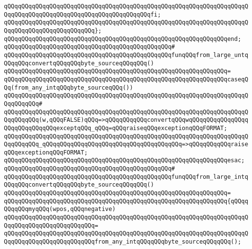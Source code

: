 \verb|qQQqqQQqqQQqqQQqqQQqqQQqqQQqqQQqqQQqqQQqqQQqqQQqqQQqqQQqqQQqqQQqqQQqqQQqqQQqqQQqqQQqqQQqqQQqqQQqqQQqqQQqqQQqqQQqfi;|\newline
\verb|qQQqqQQqqQQqqQQqqQQqqQQqqQQqqQQqqQQqqQQqqQQqqQQqqQQqqQQqqQQqqQQqqQQqqQQqqQQqqQQqqQQqqQQqqQQqqQQq};|\newline
\verb|qQQqqQQqqQQqqQQqqQQqqQQqqQQqqQQqqQQqqQQqqQQqqQQqqQQqqQQqqQQqqQQqend;|\newline
\newline
\verb|qQQqqQQqqQQqqQQqqQQqqQQqqQQqqQQqqQQqqQQqqQQqqQQq#|\newline
\verb|qQQqqQQqqQQqqQQqqQQqqQQqqQQqqQQqqQQqqQQqqQQqqQQqfunqQQqfrom_large_untqQQqqQQqconvertqQQqqQQqbyte_sourceqQQqqQQq()|\newline
\verb|qQQqqQQqqQQqqQQqqQQqqQQqqQQqqQQqqQQqqQQqqQQqqQQqqQQqqQQqqQQqqQQq=|\newline
\verb|qQQqqQQqqQQqqQQqqQQqqQQqqQQqqQQqqQQqqQQqqQQqqQQqqQQqqQQqqQQqqQQqcaseqQQq(from_any_intqQQqbyte_sourceqQQq())|\newline
\verb|qQQqqQQqqQQqqQQqqQQqqQQqqQQqqQQqqQQqqQQqqQQqqQQqqQQqqQQqqQQqqQQqqQQqqQQqqQQqqQQq#|\newline
\verb|qQQqqQQqqQQqqQQqqQQqqQQqqQQqqQQqqQQqqQQqqQQqqQQqqQQqqQQqqQQqqQQqqQQqqQQqqQQqqQQq(w,qQQqFALSE)qQQq=>qQQqqQQqqQQqconvertqQQqwqQQqqQQqqQQqqQQqqQQqqQQqqQQqqQQqexceptqQQq_qQQq=qQQqraiseqQQqexceptionqQQqFORMAT;|\newline
\verb|qQQqqQQqqQQqqQQqqQQqqQQqqQQqqQQqqQQqqQQqqQQqqQQqqQQqqQQqqQQqqQQqqQQqqQQqqQQqqQQq_qQQqqQQqqQQqqQQqqQQqqQQqqQQqqQQqqQQqqQQq=>qQQqqQQqqQQqraiseqQQqexceptionqQQqFORMAT;|\newline
\verb|qQQqqQQqqQQqqQQqqQQqqQQqqQQqqQQqqQQqqQQqqQQqqQQqqQQqqQQqqQQqqQQqesac;|\newline
\newline
\verb|qQQqqQQqqQQqqQQqqQQqqQQqqQQqqQQqqQQqqQQqqQQqqQQq#|\newline
\verb|qQQqqQQqqQQqqQQqqQQqqQQqqQQqqQQqqQQqqQQqqQQqqQQqfunqQQqfrom_large_intqQQqqQQqconvertqQQqqQQqbyte_sourceqQQqqQQq()|\newline
\verb|qQQqqQQqqQQqqQQqqQQqqQQqqQQqqQQqqQQqqQQqqQQqqQQqqQQqqQQqqQQqqQQq=|\newline
\verb|qQQqqQQqqQQqqQQqqQQqqQQqqQQqqQQqqQQqqQQqqQQqqQQqqQQqqQQqqQQqqQQq{qQQqqQQqqQQqmyqQQq(wpos,qQQqnegative)|\newline
\verb|qQQqqQQqqQQqqQQqqQQqqQQqqQQqqQQqqQQqqQQqqQQqqQQqqQQqqQQqqQQqqQQqqQQqqQQqqQQqqQQqqQQqqQQqqQQqqQQq=|\newline
\verb|qQQqqQQqqQQqqQQqqQQqqQQqqQQqqQQqqQQqqQQqqQQqqQQqqQQqqQQqqQQqqQQqqQQqqQQqqQQqqQQqqQQqqQQqqQQqqQQqfrom_any_intqQQqqQQqbyte_sourceqQQqqQQq();|\newline
